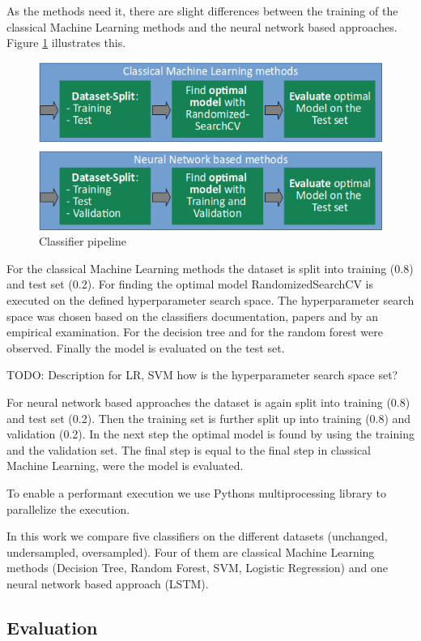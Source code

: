 As the methods need it, there are slight differences between the training of the classical Machine Learning methods and the neural network based approaches. Figure \ref{fig:classifier_pipeline} illustrates this.

\begin{figure}[ht]
	\centering
	\includegraphics[width=0.7\linewidth]{figures/classifier_pipeline.png}
	\caption{Classifier pipeline}
	\label{fig:classifier_pipeline}
\end{figure}

For the classical Machine Learning methods the dataset is split into training (0.8) and test set (0.2). For finding the optimal model Randomized\-SearchCV is executed on the defined hyperparameter search space. The hyperparameter search space was chosen based on the classifiers doc\-u\-men\-ta\-tion, papers and by an empirical examination. For the decision tree \cite{mantovani2019empirical} and for the random forest \cite{probstHyperparametersTuningStrategies2019} were observed. Finally the model is evaluated on the test set.

TODO: Description for LR, SVM how is the hyperparameter search space set?

For neural network based approaches the dataset is again split into training (0.8) and test set (0.2). Then the training set is further split up into training (0.8) and validation (0.2). In the next step the optimal model is found by using the training and the validation set. The final step is equal to the final step in classical Machine Learning, were the model is evaluated.

To enable a performant execution we use Pythons multiprocessing library to parallelize the execution.

In this work we compare five classifiers on the different datasets (unchanged, undersampled, oversampled). Four of them are classical Machine Learning methods (Decision Tree, Random Forest, SVM, Logistic Regression) and one neural network based approach (LSTM).


\subsection{Evaluation}
\label{ch:approachF}

